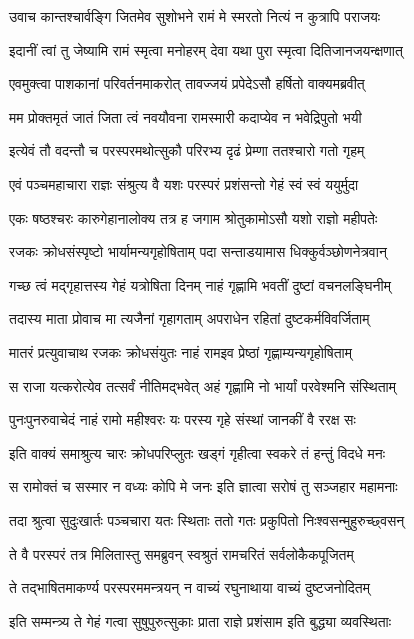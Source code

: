 \twolineshloka
{उवाच कान्तश्चार्वङ्गि जितमेव सुशोभने}
{रामं मे स्मरतो नित्यं न कुत्रापि पराजयः}%

\twolineshloka
{इदानीं त्वां तु जेष्यामि रामं स्मृत्वा मनोहरम्}
{देवा यथा पुरा स्मृत्वा दितिजानजयन्क्षणात्}%

\twolineshloka
{एवमुक्त्वा पाशकानां परिवर्तनमाकरोत्}
{तावज्जयं प्रपेदेऽसौ हर्षितो वाक्यमब्रवीत्}%

\twolineshloka
{मम प्रोक्तमृतं जातं जिता त्वं नवयौवना}
{रामस्मारी कदाप्येव न भवेद्रिपुतो भयी}%

\twolineshloka
{इत्येवं तौ वदन्तौ च परस्परमथोत्सुकौ}
{परिरभ्य दृढं प्रेम्णा ततश्चारो गतो गृहम्}%

\twolineshloka
{एवं पञ्चमहाचारा राज्ञः संश्रुत्य वै यशः}
{परस्परं प्रशंसन्तो गेहं स्वं स्वं ययुर्मुदा}%

\twolineshloka
{एकः षष्ठश्चरः कारुगेहानालोक्य तत्र ह}
{जगाम श्रोतुकामोऽसौ यशो राज्ञो महीपतेः}%

\twolineshloka
{रजकः क्रोधसंस्पृष्टो भार्यामन्यगृहोषिताम्}
{पदा सन्ताडयामास धिक्कुर्वञ्छोणनेत्रवान्}%

\twolineshloka
{गच्छ त्वं मद्गृहात्तस्य गेहं यत्रोषिता दिनम्}
{नाहं गृह्णामि भवतीं दुष्टां वचनलङ्घिनीम्}%

\twolineshloka
{तदास्य माता प्रोवाच मा त्यजैनां गृहागताम्}
{अपराधेन रहितां दुष्टकर्मविवर्जिताम्}%

\twolineshloka
{मातरं प्रत्युवाचाथ रजकः क्रोधसंयुतः}
{नाहं रामइव प्रेष्ठां गृह्णाम्यन्यगृहोषिताम्}%

\twolineshloka
{स राजा यत्करोत्येव तत्सर्वं नीतिमद्भवेत्}
{अहं गृह्णामि नो भार्यां परवेश्मनि संस्थिताम्}%

\twolineshloka
{पुनःपुनरुवाचेदं नाहं रामो महीश्वरः}
{यः परस्य गृहे संस्थां जानकीं वै ररक्ष सः}%

\twolineshloka
{इति वाक्यं समाश्रुत्य चारः क्रोधपरिप्लुतः}
{खड्गं गृहीत्वा स्वकरे तं हन्तुं विदधे मनः}%

\twolineshloka
{स रामोक्तं च सस्मार न वध्यः कोपि मे जनः}
{इति ज्ञात्वा सरोषं तु सञ्जहार महामनाः}%

\twolineshloka
{तदा श्रुत्वा सुदुःखार्तः पञ्चचारा यतः स्थिताः}
{ततो गतः प्रकुपितो निःश्वसन्मुहुरुच्छ्वसन्}%

\twolineshloka
{ते वै परस्परं तत्र मिलितास्तु समब्रुवन्}
{स्वश्रुतं रामचरितं सर्वलोकैकपूजितम्}%

\twolineshloka
{ते तद्भाषितमाकर्ण्य परस्परममन्त्रयन्}
{न वाच्यं रघुनाथाया वाच्यं दुष्टजनोदितम्}%

\twolineshloka
{इति सम्मन्त्र्य ते गेहं गत्वा सुषुपुरुत्सुकाः}
{प्राता राज्ञे प्रशंसाम इति बुद्ध्या व्यवस्थिताः}%

